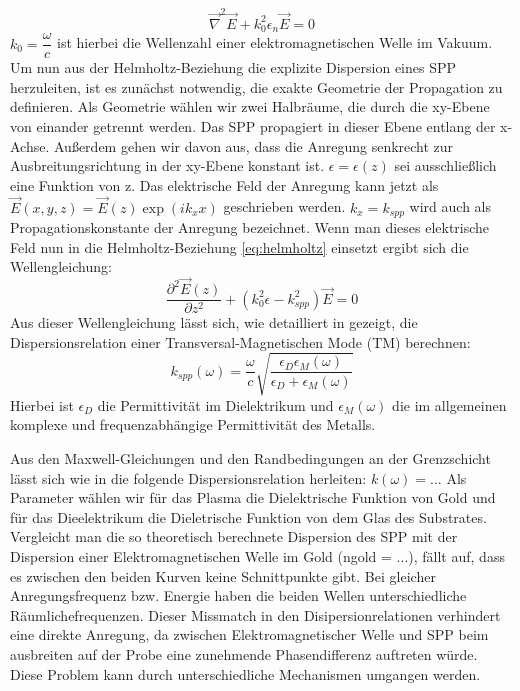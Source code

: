 \documentclass{article}
\begin{document}
	\begin{equation}
		\label{eq:helmholtz}
		\vec{\nabla}^2\vec{E} + k_0^2\epsilon_n\vec{E} = 0
	\end{equation}
	$k_0 = \dfrac{\omega}{c}$ ist hierbei die Wellenzahl einer elektromagnetischen Welle im Vakuum. Um nun aus der Helmholtz-Beziehung die explizite Dispersion eines SPP herzuleiten, ist es zunächst notwendig, die exakte Geometrie der Propagation zu definieren. Als Geometrie wählen wir zwei Halbräume, die durch die xy-Ebene von einander getrennt werden. Das SPP propagiert in dieser Ebene entlang der x-Achse. Außerdem gehen wir davon aus, dass die Anregung senkrecht zur Ausbreitungsrichtung in der xy-Ebene konstant ist. $\epsilon = \epsilon\left(z\right)$ sei ausschließlich eine Funktion von z. Das elektrische Feld der Anregung kann jetzt als $\vec{E}\left(x, y, z\right) = \vec{E}\left(z\right)\exp\left(ik_x x\right)$ geschrieben werden. $k_x = k_{spp}$ wird auch als Propagationskonstante der Anregung bezeichnet. Wenn man dieses elektrische Feld nun in die Helmholtz-Beziehung \eqref{eq:helmholtz} einsetzt ergibt sich die Wellengleichung:
	\begin{equation}
		\label{eq:spp_waveeq}
		\dfrac{\partial^2\vec{E}\left(z\right)}{\partial z^2}+ \left(k_0^2\epsilon-k_{spp}^2\right)\vec{E} = 0
	\end{equation}
	Aus dieser Wellengleichung lässt sich, wie detailliert in \cite{Maier.2007} gezeigt, die Dispersionsrelation einer Transversal-Magnetischen Mode (TM) berechnen:
	\begin{equation}
		\label{eq:dispersion_spp}
		k_{spp}\left(\omega\right) = \dfrac{\omega}{c} \sqrt{\dfrac{\epsilon_D\epsilon_M(\omega)}{\epsilon_D + \epsilon_M(\omega)}}
	\end{equation}
	Hierbei ist $\epsilon_D$ die Permittivität im Dielektrikum und $\epsilon_M(\omega)$ die im allgemeinen komplexe und frequenzabhängige Permittivität des Metalls.
	

	Aus den Maxwell-Gleichungen und den Randbedingungen an der Grenzschicht lässt sich wie in   die folgende Dispersionsrelation herleiten: $k(\omega) = ...$ Als Parameter wählen wir für das Plasma die Dielektrische Funktion von Gold und für das Dieelektrikum die Dieletrische Funktion von dem Glas des Substrates. Vergleicht man die so theoretisch berechnete Dispersion des SPP mit der Dispersion einer Elektromagnetischen Welle im Gold (ngold = ...), fällt auf, dass es zwischen den beiden Kurven keine Schnittpunkte gibt. Bei gleicher Anregungsfrequenz bzw. Energie haben die beiden Wellen unterschiedliche Räumlichefrequenzen. Dieser Missmatch in den Disipersionrelationen verhindert eine direkte Anregung, da zwischen Elektromagnetischer Welle und SPP beim ausbreiten auf der Probe eine zunehmende Phasendifferenz auftreten würde. Diese Problem kann durch unterschiedliche Mechanismen umgangen werden.		
\end{document}
